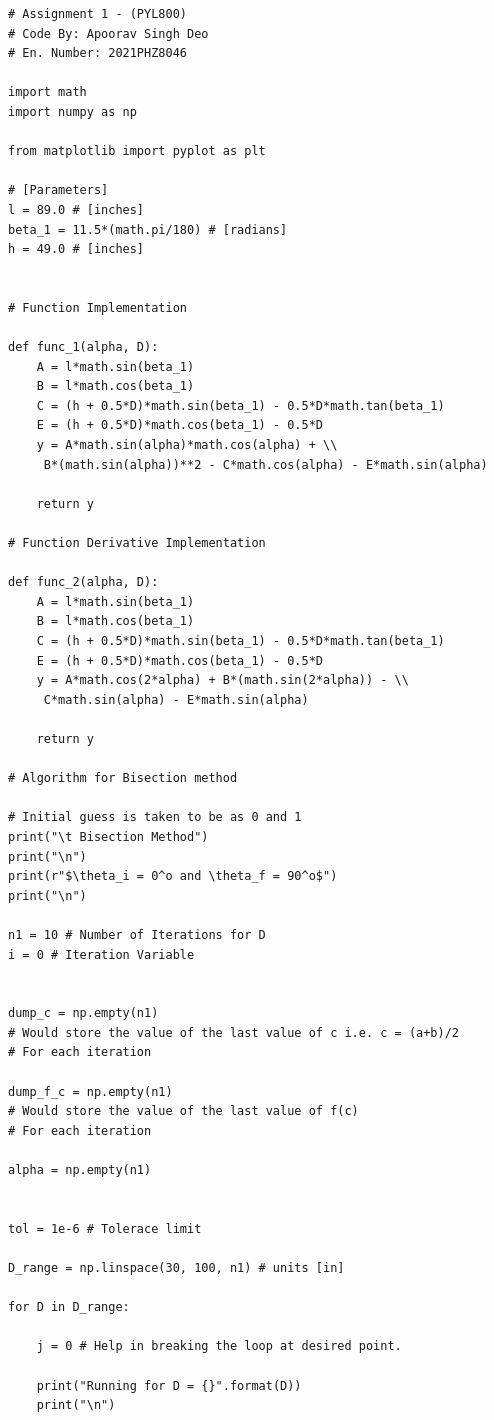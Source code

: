 \documentclass[11pt,a4paper]{article}
\begin{document}
\begin{mybox}
\begin{verbatim} 
# Assignment 1 - (PYL800)
# Code By: Apoorav Singh Deo 
# En. Number: 2021PHZ8046

import math 
import numpy as np

from matplotlib import pyplot as plt

# [Parameters]
l = 89.0 # [inches]
beta_1 = 11.5*(math.pi/180) # [radians]
h = 49.0 # [inches]


# Function Implementation

def func_1(alpha, D):
    A = l*math.sin(beta_1)
    B = l*math.cos(beta_1)
    C = (h + 0.5*D)*math.sin(beta_1) - 0.5*D*math.tan(beta_1)
    E = (h + 0.5*D)*math.cos(beta_1) - 0.5*D
    y = A*math.sin(alpha)*math.cos(alpha) + \\
     B*(math.sin(alpha))**2 - C*math.cos(alpha) - E*math.sin(alpha)

    return y

# Function Derivative Implementation

def func_2(alpha, D):
    A = l*math.sin(beta_1)
    B = l*math.cos(beta_1)
    C = (h + 0.5*D)*math.sin(beta_1) - 0.5*D*math.tan(beta_1)
    E = (h + 0.5*D)*math.cos(beta_1) - 0.5*D
    y = A*math.cos(2*alpha) + B*(math.sin(2*alpha)) - \\
     C*math.sin(alpha) - E*math.sin(alpha)

    return y

# Algorithm for Bisection method

# Initial guess is taken to be as 0 and 1
print("\t Bisection Method")
print("\n")
print(r"$\theta_i = 0^o and \theta_f = 90^o$")
print("\n")

n1 = 10 # Number of Iterations for D
i = 0 # Iteration Variable 


dump_c = np.empty(n1)
# Would store the value of the last value of c i.e. c = (a+b)/2
# For each iteration 

dump_f_c = np.empty(n1)
# Would store the value of the last value of f(c)
# For each iteration

alpha = np.empty(n1)


tol = 1e-6 # Tolerace limit

D_range = np.linspace(30, 100, n1) # units [in]

for D in D_range:
    
    j = 0 # Help in breaking the loop at desired point.
    
    print("Running for D = {}".format(D))
    print("\n")
    

\end{verbatim}
\end{mybox}
\end{document}
